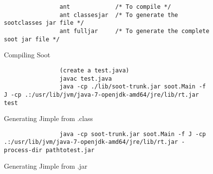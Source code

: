 \documentclass{dithesis}
\begin{document}
        \begin{figure}[H]
            \begin{lstlisting}
                ant             /* To compile */
                ant classesjar  /* To generate the sootclasses jar file */
                ant fulljar     /* To generate the complete soot jar file */
            \end{lstlisting}
        \caption{Compiling Soot}
        \end{figure}
        \begin{figure}[H]
            \begin{lstlisting}
                (create a test.java)
                javac test.java
                java -cp ./lib/soot-trunk.jar soot.Main -f J -cp .:/usr/lib/jvm/java-7-openjdk-amd64/jre/lib/rt.jar test
            \end{lstlisting}
        \caption{Generating Jimple from .class}
        \end{figure}
        \begin{figure}[H]
            \begin{lstlisting}
                java -cp soot-trunk.jar soot.Main -f J -cp .:/usr/lib/jvm/java-7-openjdk-amd64/jre/lib/rt.jar -process-dir pathtotest.jar
            \end{lstlisting}
        \caption{Generating Jimple from .jar}
        \end{figure}
\end{document}
